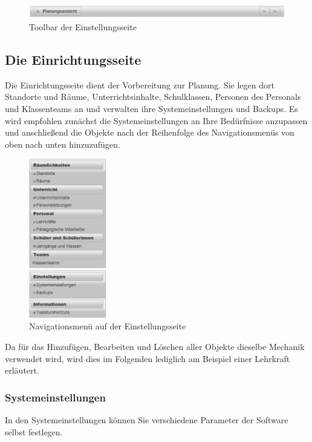 \documentclass[fontsize=12pt]{scrartcl}
\begin{document}
\begin{figure}[H]
\includegraphics[width=\textwidth]{images/bar.png}
\caption{Toolbar der Einstellungsseite}
\end{figure}

\subsection{Die Einrichtungsseite}
Die Einrichtungsseite dient der Vorbereitung zur Planung. Sie legen dort Standorte und Räume, Unterrichtsinhalte, Schulklassen, Personen des Personals und Klassenteams an und verwalten ihre Systemeinstellungen und Backups. Es wird empfohlen zunächst die Systemeinstellungen an Ihre Bedürfnisse anzupassen und anschließend die Objekte nach der Reihenfolge des Navigationsmenüs von oben nach unten hinzuzufügen.
\begin{figure}[H]
\centering
\includegraphics[width=0.3\textwidth]{images/navigationMenu.png}
\caption{Navigationsmenü auf der Einstellungsseite}
\end{figure}

Da für das Hinzufügen, Bearbeiten und Löschen aller Objekte dieselbe Mechanik verwendet wird, wird dies im Folgenden lediglich am Beispiel einer Lehrkraft erläutert.

\subsubsection{Systemeinstellungen}
In den Systemeinstellungen können Sie verschiedene Parameter der Software selbst festlegen.\\
\end{document}
